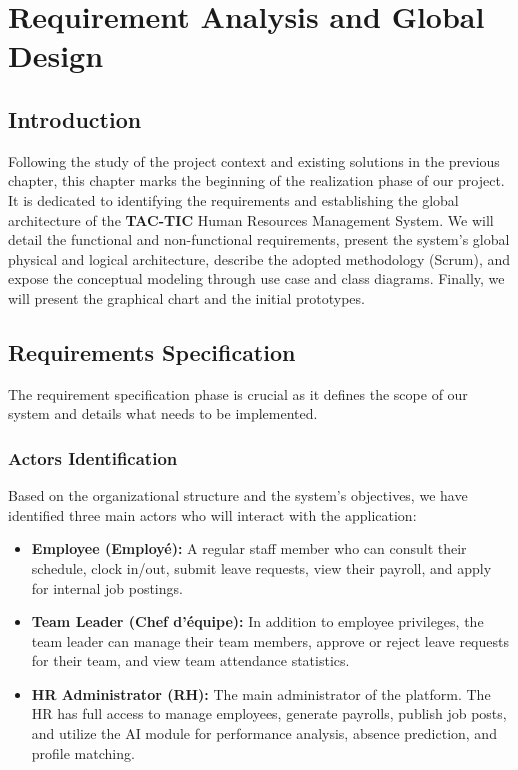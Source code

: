\chapter{Requirement Analysis and Global Design}

\section*{Introduction}

Following the study of the project context and existing solutions in the previous chapter, this chapter marks the beginning of the realization phase of our project. It is dedicated to identifying the requirements and establishing the global architecture of the \textbf{TAC-TIC} Human Resources Management System. We will detail the functional and non-functional requirements, present the system's global physical and logical architecture, describe the adopted methodology (Scrum), and expose the conceptual modeling through use case and class diagrams. Finally, we will present the graphical chart and the initial prototypes.

\section{Requirements Specification}

The requirement specification phase is crucial as it defines the scope of our system and details what needs to be implemented.

\subsection{Actors Identification}
Based on the organizational structure and the system's objectives, we have identified three main actors who will interact with the application:
\begin{itemize}
    \item \textbf{Employee (Employé):} A regular staff member who can consult their schedule, clock in/out, submit leave requests, view their payroll, and apply for internal job postings.
    \item \textbf{Team Leader (Chef d'équipe):} In addition to employee privileges, the team leader can manage their team members, approve or reject leave requests for their team, and view team attendance statistics.
    \item \textbf{HR Administrator (RH):} The main administrator of the platform. The HR has full access to manage employees, generate payrolls, publish job posts, and utilize the AI module for performance analysis, absence prediction, and profile matching.
\end{itemize}

